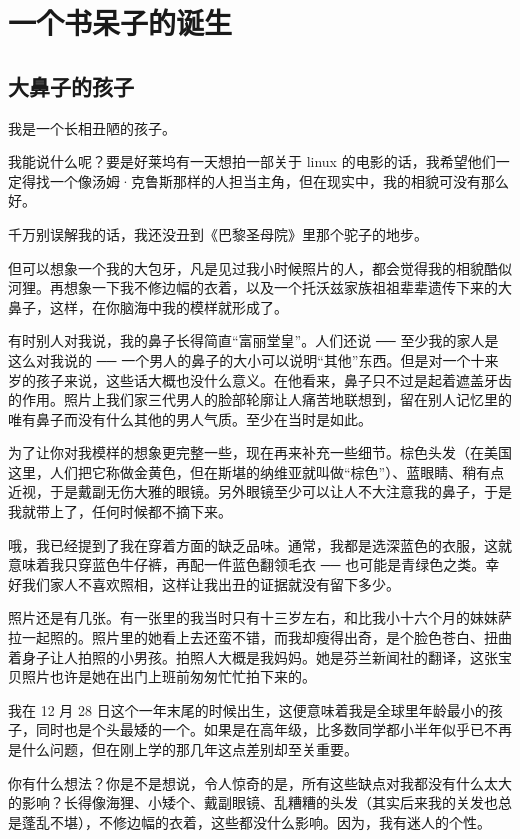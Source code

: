 \chapter{一个书呆子的诞生}
\section{大鼻子的孩子}

我是一个长相丑陋的孩子。

我能说什么呢？要是好莱坞有一天想拍一部关于 linux 的电影的话，我希望他们一定得找一个像汤姆·克鲁斯那样的人担当主角，但在现实中，我的相貌可没有那么好。

千万别误解我的话，我还没丑到《巴黎圣母院》里那个驼子的地步。

但可以想象一个我的大包牙，凡是见过我小时候照片的人，都会觉得我的相貌酷似河狸。再想象一下我不修边幅的衣着，以及一个托沃兹家族祖祖辈辈遗传下来的大鼻子，这样，在你脑海中我的模样就形成了。

有时别人对我说，我的鼻子长得简直“富丽堂皇”。人们还说 ── 至少我的家人是这么对我说的 ── 一个男人的鼻子的大小可以说明“其他”东西。但是对一个十来岁的孩子来说，这些话大概也没什么意义。在他看来，鼻子只不过是起着遮盖牙齿的作用。照片上我们家三代男人的脸部轮廓让人痛苦地联想到，留在别人记忆里的唯有鼻子而没有什么其他的男人气质。至少在当时是如此。

为了让你对我模样的想象更完整一些，现在再来补充一些细节。棕色头发（在美国这里，人们把它称做金黄色，但在斯堪的纳维亚就叫做“棕色”）、蓝眼睛、稍有点近视，于是戴副无伤大雅的眼镜。另外眼镜至少可以让人不大注意我的鼻子，于是我就带上了，任何时候都不摘下来。

哦，我已经提到了我在穿着方面的缺乏品味。通常，我都是选深蓝色的衣服，这就意味着我只穿蓝色牛仔裤，再配一件蓝色翻领毛衣 ── 也可能是青绿色之类。幸好我们家人不喜欢照相，这样让我出丑的证据就没有留下多少。

照片还是有几张。有一张里的我当时只有十三岁左右，和比我小十六个月的妹妹萨拉一起照的。照片里的她看上去还蛮不错，而我却瘦得出奇，是个脸色苍白、扭曲着身子让人拍照的小男孩。拍照人大概是我妈妈。她是芬兰新闻社的翻译，这张宝贝照片也许是她在出门上班前匆匆忙忙拍下来的。

我在 12 月 28 日这个一年末尾的时候出生，这便意味着我是全球里年龄最小的孩子，同时也是个头最矮的一个。如果是在高年级，比多数同学都小半年似乎已不再是什么问题，但在刚上学的那几年这点差别却至关重要。

你有什么想法？你是不是想说，令人惊奇的是，所有这些缺点对我都没有什么太大的影响？长得像海狸、小矮个、戴副眼镜、乱糟糟的头发（其实后来我的关发也总是蓬乱不堪），不修边幅的衣着，这些都没什么影响。因为，我有迷人的个性。


